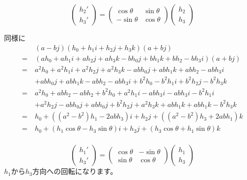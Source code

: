 \documentclass[a4paper,12pt]{jsreport}
\begin{document}
\begin{equation}
\begin{pmatrix}h_2'\\h_3'\end{pmatrix}
=\begin{pmatrix}\cos\theta&\sin\theta\\-\sin\theta&\cos\theta\end{pmatrix}
\begin{pmatrix}h_2\\h_3\end{pmatrix}
\end{equation}

同様に
\begin{equation}
\begin{split}
&(a-bj)(h_0+h_1i+h_2j+h_3k)(a+bj)\\
=~&(ah_0+ah_1i+ah_2j+ah_3k-bh_0j+bh_1k+bh_2-bh_3i)(a+bj)\\
=~&a^2h_0+a^2h_1i+a^2h_2j+a^2h_3k-abh_0j+abh_1k+abh_2-abh_3i\\
&+abh_0j+abh_1k-abh_2-abh_3i+b^2h_0-b^2h_1i+b^2h_2j-b^2h_3k\\
=~&a^2h_0+abh_2-abh_2+b^2h_0+a^2h_1i-abh_3i-abh_3i-b^2h_1i\\
&+a^2h_2j-abh_0j+abh_0j+b^2h_2j+a^2h_3k+abh_1k+abh_1k-b^2h_3k\\
=~&h_0+((a^2-b^2)h_1-2abh_3)i+h_2j+((a^2-b^2)h_3+2abh_1)k\\
=~&h_0+(h_1\cos\theta-h_3\sin\theta)i+h_2j+(h_3\cos\theta+h_1\sin\theta)k\\
\end{split}
\end{equation}

\begin{equation}
\begin{pmatrix}h_1'\\h_3'\end{pmatrix}
=\begin{pmatrix}\cos\theta&-\sin\theta\\\sin\theta&\cos\theta\end{pmatrix}
\begin{pmatrix}h_1\\h_3\end{pmatrix}
\end{equation}
$h_1$から$h_3$方向への回転になります。
\end{document}
